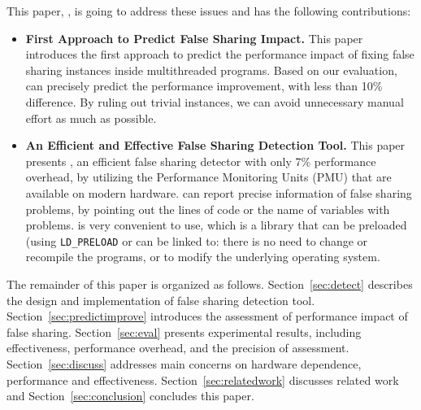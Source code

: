 \vspace{0.2in}


This paper, \cheetah{}, is going to address these issues and has the following contributions:

\begin{itemize} 

\item {\bf First Approach to Predict False Sharing Impact.} This paper introduces the first approach to predict the performance impact of fixing false sharing instances inside multithreaded programs. Based on our evaluation, \cheetah{} can precisely predict the performance improvement, with less than 10\% difference. By ruling out trivial instances, we can avoid unnecessary manual effort as much as possible. 

\item {\bf An Efficient and Effective False Sharing Detection Tool.} This paper presents \cheetah{}, an efficient false sharing detector with only 7\% performance overhead, by utilizing the Performance Monitoring Units (PMU) that are available on modern hardware. \cheetah{} can report precise information of false sharing problems, by pointing out the lines of code or the name of variables with problems. \cheetah{} is very convenient to use, which is a library that can be preloaded (using \texttt{LD\_PRELOAD} or can be linked to: there is no need to change or recompile the programs, or to modify the underlying operating system.

\end{itemize}

The remainder of this paper is organized as follows. 
Section~\ref{sec:detect} describes the design and implementation of false sharing detection tool. Section~\ref{sec:predictimprove} introduces the assessment of performance impact of false sharing. Section~\ref{sec:eval} presents experimental results, including effectiveness, performance overhead, and the precision of assessment. Section~\ref{sec:discuss} addresses main concerns on hardware dependence, performance and effectiveness. Section~\ref{sec:relatedwork} discusses related work and Section~\ref{sec:conclusion} concludes this paper. 



